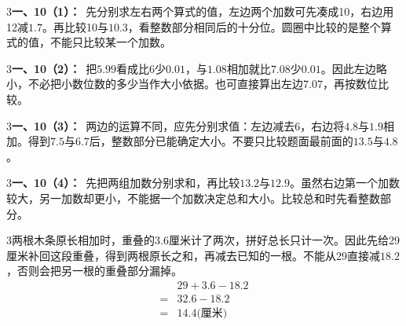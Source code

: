 \documentclass[multi=snippet,border={5bp 20bp 5bp 5bp}]{standalone}
\newenvironment{snippet}[3]{\begin{minipage}{#1bp}\color{answerred}\fontsize{#2}{#3}\selectfont\raggedright}{\end{minipage}}
\begin{document}
\begin{snippet}{505}{11.5}{14}\begin{multicols}{3}\raggedcolumns \textbf{一、10（1）：}\ 先分别求左右两个算式的值，左边两个加数可先凑成10，右边用12减\(1.7\)\allowbreak 。再比较10与\(10.3\)\allowbreak ，看整数部分相同后的十分位。圆圈中比较的是整个算式的值，不能只比较某一个加数。\end{multicols}\end{snippet}
\begin{snippet}{505}{11.5}{14}\begin{multicols}{3}\raggedcolumns \textbf{一、10（2）：}\ 把\(5.99\)\allowbreak 看成比6少\(0.01\)\allowbreak ，与\(1.08\)\allowbreak 相加就比\(7.08\)\allowbreak 少\(0.01\)\allowbreak 。因此左边略小，不必把小数位数的多少当作大小依据。也可直接算出左边\(7.07\)\allowbreak ，再按数位比较。\end{multicols}\end{snippet}
\begin{snippet}{505}{11.5}{14}\begin{multicols}{3}\raggedcolumns \textbf{一、10（3）：}\ 两边的运算不同，应先分别求值：左边减去6，右边将\(4.8\)\allowbreak 与\(1.9\)\allowbreak 相加。得到\(7.5\)\allowbreak 与\(6.7\)\allowbreak 后，整数部分已能确定大小。不要只比较题面最前面的\(13.5\)\allowbreak 与\(4.8\)\allowbreak 。\end{multicols}\end{snippet}
\begin{snippet}{505}{11.5}{14}\begin{multicols}{3}\raggedcolumns \textbf{一、10（4）：}\ 先把两组加数分别求和，再比较\(13.2\)\allowbreak 与\(12.9\)\allowbreak 。虽然右边第一个加数较大，另一加数却更小，不能据一个加数决定总和大小。比较总和时先看整数部分。\end{multicols}\end{snippet}
\begin{snippet}{505}{11.5}{14}\begin{multicols}{3}\raggedcolumns 两根木条原长相加时，重叠的\(3.6\)\allowbreak 厘米计了两次，拼好总长只计一次。因此先给29厘米补回这段重叠，得到两根原长之和，再减去已知的一根。不能从29直接减\(18.2\)\allowbreak ，否则会把另一根的重叠部分漏掉。\[\begin{aligned}&29+3.6-18.2\\={}&32.6-18.2\\={}&14.4\text{(厘米)}\end{aligned}\]\end{multicols}\end{snippet}
\end{document}
